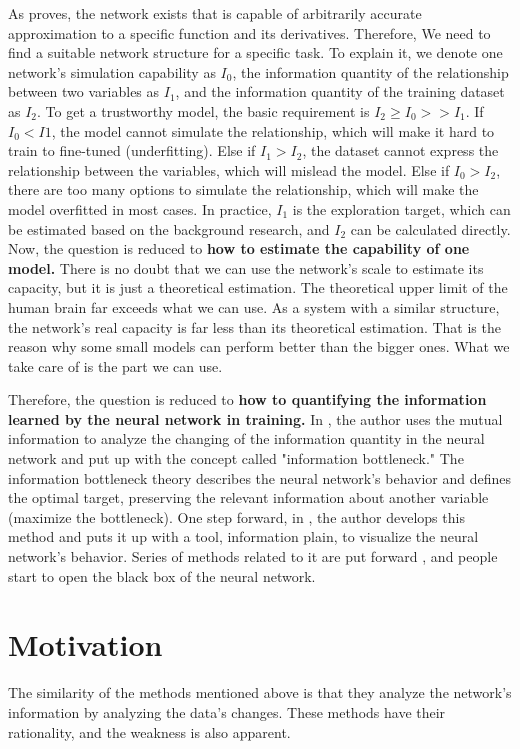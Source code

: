 \documentclass[letterpaper]{article} %
\begin{document}
As \cite{hornik1991approximation} proves, the network exists that is capable of arbitrarily accurate approximation to a specific function and its derivatives. Therefore, We need to find a suitable network structure for a specific task. To explain it, we denote one network's simulation capability as $I_0$, the information quantity of the relationship between two variables as $I_1$, and the information quantity of the training dataset as $I_2$. To get a trustworthy model, the basic requirement is $I_2 \geq I_0 >> I_1$. If $I_0<I1$, the model cannot simulate the relationship, which will make it hard to train to fine-tuned (underfitting). Else if $I_1 > I_2$, the dataset cannot express the relationship between the variables, which will mislead the model. Else if $I_0 > I_2$, there are too many options to simulate the relationship, which will make the model overfitted in most cases. In practice, $I_1$ is the exploration target, which can be estimated based on the background research, and $I_2$ can be calculated directly. Now, the question is reduced to \textbf{how to estimate the capability of one model.} There is no doubt that we can use the network's scale to estimate its capacity, but it is just a theoretical estimation. The theoretical upper limit of the human brain far exceeds what we can use. As a system with a similar structure, the network's real capacity is far less than its theoretical estimation. That is the reason why some small models can perform better than the bigger ones. What we take care of is the part we can use.

Therefore, the question is reduced to \textbf{how to quantifying the information learned by the neural network in training.} In \cite{tishby2000information}, the author uses the mutual information to analyze the changing of the information quantity in the neural network and put up with the concept called "information bottleneck." The information bottleneck theory describes the neural network's behavior and defines the optimal target, preserving the relevant information about another variable (maximize the bottleneck). One step forward, in \cite{tishby2015deep}, the author develops this method and puts it up with a tool, information plain, to visualize the neural network's behavior. Series of methods related to it are put forward \cite{alemi2016deep,higgins2016beta,yu2020understanding,achille2019information}, and people start to open the black box of the neural network.

\section{Motivation}
The similarity of the methods mentioned above is that they analyze the network's information by analyzing the data's changes. These methods have their rationality, and the weakness is also apparent.
\end{document}
